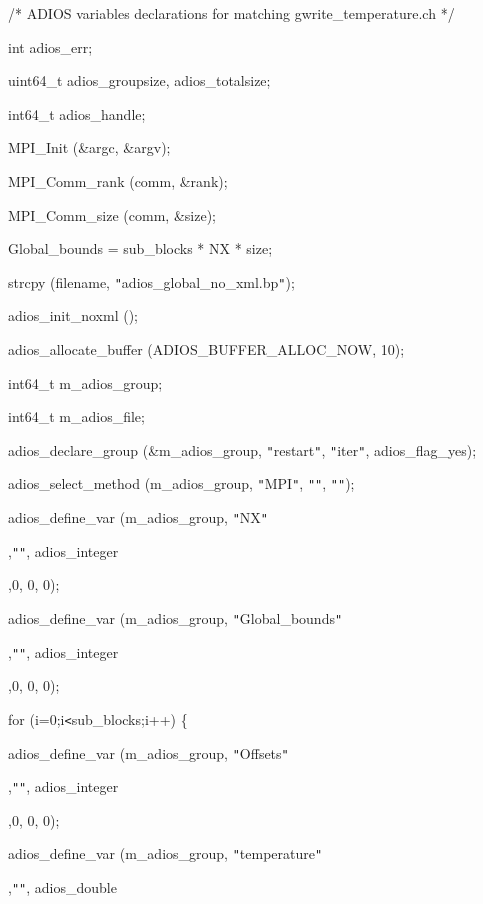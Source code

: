 \parindent=28pt
/* ADIOS variables declarations for matching gwrite\_temperature.ch */

int         adios\_err;

\parindent=57pt
uint64\_t    adios\_groupsize, adios\_totalsize;

\parindent=28pt
int64\_t     adios\_handle;

MPI\_Init (\&argc, \&argv);

\parindent=57pt
MPI\_Comm\_rank (comm, \&rank);

\parindent=28pt
MPI\_Comm\_size (comm, \&size);

Global\_bounds = sub\_blocks * NX * size;

\parindent=57pt
strcpy (filename, \texttt{"}adios\_global\_no\_xml.bp\texttt{"});

\parindent=28pt
adios\_init\_noxml ();

adios\_allocate\_buffer (ADIOS\_BUFFER\_ALLOC\_NOW, 10);

\parindent=57pt
int64\_t       m\_adios\_group;

\parindent=28pt
int64\_t       m\_adios\_file;

adios\_declare\_group (\&m\_adios\_group, \texttt{"}restart\texttt{"}, \texttt{"}iter\texttt{"}, 
adios\_flag\_yes);

\parindent=57pt
adios\_select\_method (m\_adios\_group, \texttt{"}MPI\texttt{"}, \texttt{"}\texttt{"}, 
\texttt{"}\texttt{"});

\parindent=28pt
adios\_define\_var (m\_adios\_group, \texttt{"}NX\texttt{"}

\parindent=86pt
,\texttt{"}\texttt{"}, adios\_integer

,0, 0, 0);

\parindent=115pt
adios\_define\_var (m\_adios\_group, \texttt{"}Global\_bounds\texttt{"}

\parindent=86pt
,\texttt{"}\texttt{"}, adios\_integer

,0, 0, 0);

\parindent=115pt
for (i=0;i\texttt{<}sub\_blocks;i++) \{

\parindent=39pt
adios\_define\_var (m\_adios\_group, \texttt{"}Offsets\texttt{"}

\parindent=86pt
,\texttt{"}\texttt{"}, adios\_integer

,0, 0, 0);

\parindent=126pt
adios\_define\_var (m\_adios\_group, \texttt{"}temperature\texttt{"}

\parindent=86pt
,\texttt{"}\texttt{"}, adios\_double

